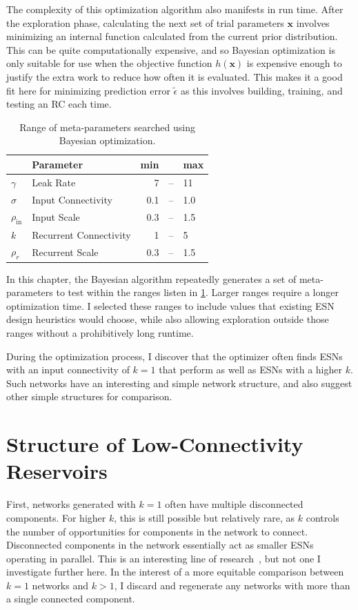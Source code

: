 The complexity of this optimization algorithm also manifests in run
time. After the exploration phase, calculating the next set of trial
parameters $\bm{x}$ involves minimizing an internal function
calculated from the current prior distribution. This can be quite
computationally expensive, and so Bayesian optimization is only
suitable for use when the objective function $h(\bm{x})$ is expensive
enough to justify the extra work to reduce how often it is
evaluated. This makes it a good fit here for minimizing prediction error
$\tilde{\epsilon}$ as this involves building, training, and testing
an RC each time.

\begin{table}
  \caption{Range of meta-parameters searched using Bayesian optimization.}
  \begin{tabular}{llrcl}
    & Parameter & min & & max \\
    \hline
    $\gamma$ & Leak Rate & 7 & -- & 11 \\
    $\sigma$ & Input Connectivity & 0.1 & -- & 1.0 \\
    $\rho_\text{in}$ & Input Scale & 0.3 & -- & 1.5 \\
    $k$ & Recurrent Connectivity & 1 & -- & 5 \\
    $\rho_r$ & Recurrent Scale & 0.3 & -- & 1.5 \\
  \end{tabular}%
  \label{tab:bayes-ranges}
\end{table}

In this chapter, the Bayesian algorithm repeatedly generates a set of
meta-parameters to test within the ranges listen in
\cref{tab:bayes-ranges}. Larger ranges require a longer
optimization time. I selected these ranges to include values that
existing ESN design heuristics would choose, while also allowing
exploration outside those ranges without a prohibitively long runtime.

During the optimization process, I discover that the optimizer
often finds ESNs with an input connectivity of $k = 1$ that perform as well as ESNs with a
higher $k$. Such networks have an interesting and simple network
structure, and also suggest other simple structures for comparison.

\section{Structure of Low-Connectivity Reservoirs}

First, networks generated with $k = 1$ often have multiple
disconnected components. For higher $k$, this is still possible but
relatively rare, as $k$ controls the number of opportunities for
components in the network to connect. Disconnected components in the
network essentially act as smaller ESNs operating in parallel. This is an
interesting line of research~\cite{pathak2018}, but not one I
investigate further here. In the interest of a more equitable
comparison between $k = 1$ networks and $k > 1$, I discard and
regenerate any networks with more than a single connected component.

